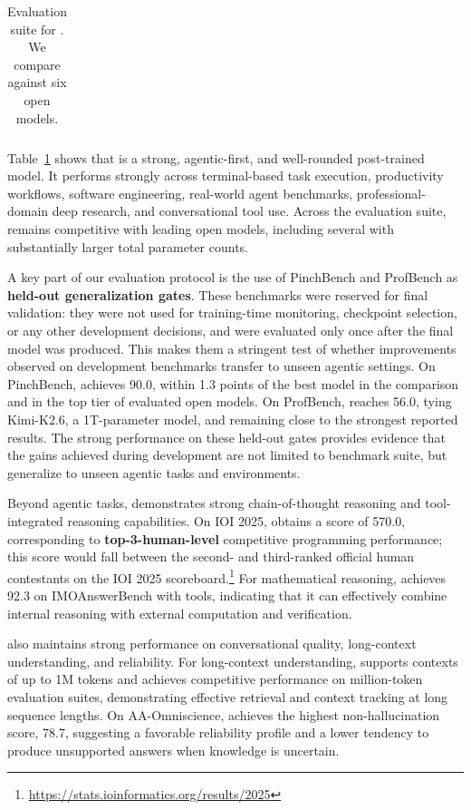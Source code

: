 \begin{table}[!t]
{\begin{tabular}{l|c c c c c c c}
\bottomrule
\end{tabular}%
}

\caption{
Evaluation suite for \ourmodel. We compare against six open models.
}
\label{tab:ultra_comparison}
\end{table}

Table~\ref{tab:ultra_comparison} shows that \ourmodel is a strong, agentic-first, and well-rounded post-trained model. It performs strongly across terminal-based task execution, productivity workflows, software engineering, real-world agent benchmarks, professional-domain deep research, and conversational tool use. Across the evaluation suite, \ourmodel remains competitive with leading open models, including several with substantially larger total parameter counts.

A key part of our evaluation protocol is the use of PinchBench and ProfBench as \textbf{held-out generalization gates}. These benchmarks were reserved for final validation: they were not used for training-time monitoring, checkpoint selection, or any other development decisions, and were evaluated only once after the final model was produced. This makes them a stringent test of whether improvements observed on development benchmarks transfer to unseen agentic settings. On PinchBench, \ourmodel achieves 90.0, within 1.3 points of the best model in the comparison and in the top tier of evaluated open models. On ProfBench, \ourmodel reaches 56.0, tying Kimi-K2.6, a 1T-parameter model, and remaining close to the strongest reported results. The strong performance on these held-out gates provides evidence that the gains achieved during development are not limited to benchmark suite, but generalize to unseen agentic tasks and environments.


Beyond agentic tasks, \ourmodel demonstrates strong chain-of-thought reasoning and tool-integrated reasoning capabilities. On IOI 2025, \ourmodel obtains a score of 570.0, corresponding to \textbf{top-3-human-level} competitive programming performance; this score would fall between the second- and third-ranked official human contestants on the IOI 2025 scoreboard.\footnote{\url{https://stats.ioinformatics.org/results/2025}} For mathematical reasoning, \ourmodel achieves 92.3 on IMOAnswerBench with tools, indicating that it can effectively combine internal reasoning with external computation and verification.

\ourmodel also maintains strong performance on conversational quality, long-context understanding, and reliability. For long-context understanding, \ourmodel supports contexts of up to 1M tokens and achieves competitive performance on million-token evaluation suites, demonstrating effective retrieval and context tracking at long sequence lengths. On AA-Omniscience, \ourmodel achieves the highest non-hallucination score, 78.7, suggesting a favorable reliability profile and a lower tendency to produce unsupported answers when knowledge is uncertain.

